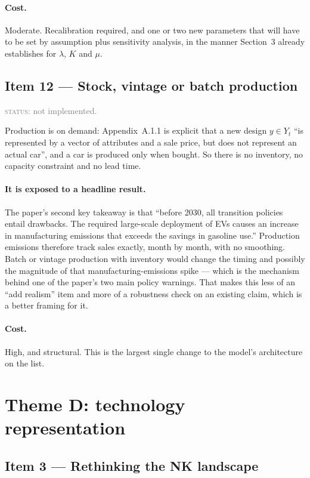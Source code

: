 \documentclass[11pt]{article}
\newcommand{\status}[1]{\textcolor{gray}{\textsc{status:} #1}}
\begin{document}
\paragraph{Cost.} Moderate. Recalibration required, and one or two new
parameters that will have to be set by assumption plus sensitivity analysis,
in the manner Section~3 already establishes for $\lambda$, $K$ and $\mu$.

\subsection{Item 12 --- Stock, vintage or batch production}

\status{not implemented.}

Production is on demand: Appendix~A.1.1 is explicit that a new design
$y \in Y_t$ ``is represented by a vector of attributes and a sale price, but
does not represent an actual car'', and a car is produced only when bought.
So there is no inventory, no capacity constraint and no lead time.

\paragraph{It is exposed to a headline result.} The paper's second key
takeaway is that ``before 2030, all transition policies entail drawbacks.
The required large-scale deployment of EVs causes an increase in
manufacturing emissions that exceeds the savings in gasoline use.''
Production emissions therefore track sales exactly, month by month, with no
smoothing. Batch or vintage production with inventory would change the
timing and possibly the magnitude of that manufacturing-emissions spike ---
which is the mechanism behind one of the paper's two main policy warnings.
That makes this less of an ``add realism'' item and more of a robustness
check on an existing claim, which is a better framing for it.

\paragraph{Cost.} High, and structural. This is the largest single change to
the model's architecture on the list.

\section{Theme D: technology representation}

\subsection{Item 3 --- Rethinking the NK landscape}
\end{document}

